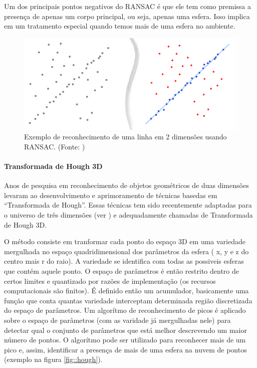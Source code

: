 Um dos principais pontos negativos do RANSAC é que ele tem como premissa a
presença de apenas um corpo principal, ou seja, apenas uma esfera. Isso implica
em um tratamento especial quando temos mais de uma esfera no ambiente.

\begin{figure}[h!]
   \centering
   \includegraphics[width=0.95\columnwidth]{detail/figs/localizacao/ransac}
   \caption{Exemplo de reconhecimento de uma linha em 2 dimensões usando
   RANSAC. (Fonte: \cite{ransac})}
   \label{fig::ransac}
\end{figure}
 
 \paragraph{Transformada de Hough 3D}
Anos de pesquisa em reconhecimento de objetos geométricos de duas dimensões
levaram ao desenvolvimento e aprimoramento de técnicas basedas em ``Transformada
de Hough''. Essas técnicas tem sido recentemente adaptadas para o universo de
três dimensões (ver \cite{hough2014}) e adequadamente chamadas de Transformada
de Hough 3D.

O método consiste em tranformar cada ponto do espaço 3D em uma variedade
mergulhada no espaço quadridimensional dos parâmetros da esfera ( x, y e z do
centro mais r do raio). A variedade se identifica com todas as possiveis esferas
que contém aquele ponto. O espaço de parâmetros é então restrito dentro de
certos limites e quantizado por razões de implementação (os recursos
computacionais são finitos). É definido então um acumulador, basicamente uma
função que conta quantas variedade interceptam determinada região discretizada
do espaço de parâmetros. Um algorítmo de reconhecimento de picos é aplicado
sobre o espaço de parâmetros (com as varidade já mergulhadas nele) para detectar
qual o conjunto de parâmetros que está melhor descrevendo um maior número de
pontos. O algorítmo pode ser utilizado para reconhecer mais de um pico e, assim,
identificar a presença de mais de uma esfera na nuvem de pontos (exemplo na
figura \ref{fig::hough}).


